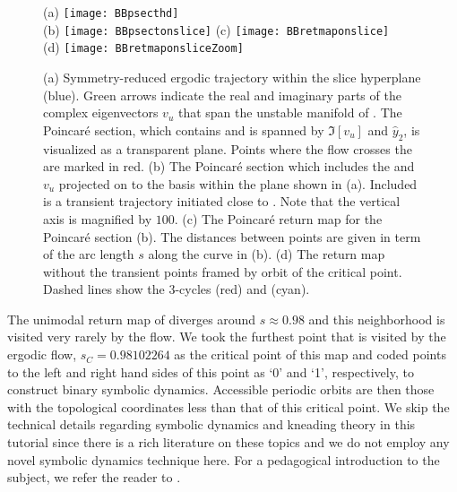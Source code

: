 \begin{figure}
\centering
  (a) \texttt{[image: BBpsecthd]} \\
  (b) \texttt{[image: BBpsectonslice]}
  (c) \texttt{[image: BBretmaponslice]} \\
  (d) \texttt{[image: BBretmaponsliceZoom]}
\caption{(a) Symmetry-reduced ergodic trajectory within the slice hyperplane (blue).
			Green arrows indicate the real and imaginary parts of the complex eigenvectors
			$v_u$ that span the unstable manifold of \REQV{}{}. The Poincar\'e section, which contains \REQV{}{} and is spanned by
			$\Im[v_u]$ and $\hat{y}_2$, is visualized as a transparent plane. Points where the flow crosses
			the are marked in red.
		 (b) The Poincar\'e section which includes the \REQV{}{} and $v_u$ projected
			on to the basis within the plane shown in (a). Included is a
            transient trajectory initiated close to \REQV{}{}. Note that
		  	the vertical axis is magnified by $100$.
		 (c) The Poincar\'e return map for the Poincar\'e section (b). The distances between points
		are given in term of the arc length $s$ along the curve in (b).
		 (d) The return map without the transient points framed by
            orbit of the critical point.
		 	Dashed lines show the 3-cycles  (red) and  (cyan).}
\label{fig:psectandretmap}
\end{figure}

The unimodal return map of  diverges around
$s \approx 0.98$ and this neighborhood is visited very rarely by the flow. We
took the furthest point that is visited by the ergodic flow, $s_C=0.98102264$
as the critical point of this map and coded points to the left and right hand sides of this
point as `0' and `1', respectively, to construct binary symbolic dynamics.
Accessible periodic orbits are then those with the topological coordinates
less than that of this critical point. We skip the technical details
regarding symbolic dynamics and kneading theory in this tutorial since
there is a rich literature on these topics and we do not employ any novel
symbolic dynamics technique here. For a pedagogical introduction to the
subject, we refer the reader to .


